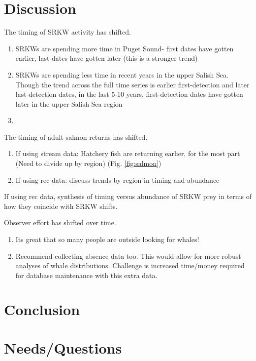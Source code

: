 \documentclass{article}
\begin{document}
\section*{Discussion}
\par The timing of SRKW activity has shifted. 
\begin{enumerate}
\item SRKWs are spending more time in Puget Sound- first dates have gotten earlier, last dates have gotten later (this is a stronger trend)
\item SRKWs are spending less time in recent years in the upper Salish Sea. Though the trend across the full time series is earlier first-detection and later last-detection dates, in the last 5-10 years, first-detection dates have gotten later in the upper Salish Sea region 
\item 
\end{enumerate}
\par The timing of adult salmon returns has shifted. 
\begin{enumerate}
\item If using stream data: Hatchery fish are returning earlier, for the most part (Need to divide up by region) (Fig. \ref{fig:salmon})
\item If using rec data: discuss trends by region in timing and abundance
\end{enumerate}
\par If using rec data, synthesis of timing versus abundance of SRKW prey in terms of how they coincide with SRKW shifts.
\par Observer effort has shifted over time. 
\begin{enumerate}
\item Its great that so many people are outside looking for whales!
\item Recommend collecting absence data too. This would allow for more robust analyses of whale distributions. Challenge is increased time/money required for database maintenance with this extra data.
\end{enumerate}

\section*{Conclusion}

\section*{Needs/Questions}
\end{document}
